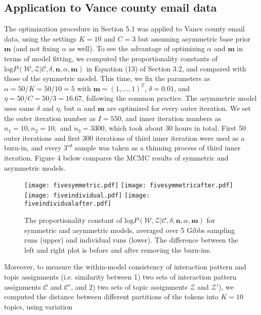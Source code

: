 \documentclass[a4paper]{article}
\begin{document}
\subsection{Application to Vance county email data}
The optimization procedure in Section 5.1 was applied to Vance county email data, using the settings $K=10$ and $C=3$ but assuming asymmetric base prior $\boldsymbol{m}$ (and not fixing $\alpha$ as well). To see the advantage of optimizing $\alpha$ and $\boldsymbol{m}$ in terms of model fitting, we computed the proportionality constants of $\mbox{log}P(\mathcal{W},\mathcal{Z}|\mathcal{C}, \delta, \boldsymbol{n}, \alpha, \boldsymbol{m})$ in Equation (13) of Section 3.2,  and compared with those of the symmetric model. This time, we fix the parameters as $\alpha=50/K=50/10=5$ with $\boldsymbol{m}=(1,...,1)^T$, $\delta=0.01$, and $\eta=50/C=50/3=16.67$, following the common practice. The asymmetric model uses same $\delta$ and $\eta$, but $\alpha$ and $\boldsymbol{m}$ are optimized for every outer iteration. We set the outer iteration number as $I=550$, and inner iteration numbers as $n_1=10, n_2=10,$ and $n_3=3300$, which took about 30 hours in total. First 50 outer iterations and first 300 iterations of third inner iteration were used as a burn-in, and every $3^{rd}$ sample was taken as a thinning process of third inner iteration. Figure 4 below compares the MCMC results of symmetric and asymmetric models. 
\begin{figure}[ht]
	\centering
	\texttt{[image: fivesymmetric.pdf]} 
		\texttt{[image: fivesymmetricafter.pdf]} 
			\texttt{[image: fiveindividual.pdf]} 
			\texttt{[image: fiveindividualafter.pdf]} 
			
	\caption{The proportionality constant of $\mbox{log}P(\mathcal{W},\mathcal{Z}|\mathcal{C}, \delta, \boldsymbol{n}, \alpha, \boldsymbol{m})$ for symmetric and asymmetric models, averaged over 5 Gibbs sampling runs (upper) and individual runs (lower). The difference between the left and right plot is before and after removing the burn-ins.}
	\label{fig:logPL1}
\end{figure}
\newline Moreover, to measure the within-model consistency of interaction pattern and topic assignments (i.e. similarity between 1) two sets of interaction pattern assignments $\mathcal{C}$ and $\mathcal{C'}$, and 2) two sets of topic
assignments $\mathcal{Z}$ and $\mathcal{Z'}$), we computed the distance between different partitions
of the tokens into $K=10$ topics, using variation
\end{document}
